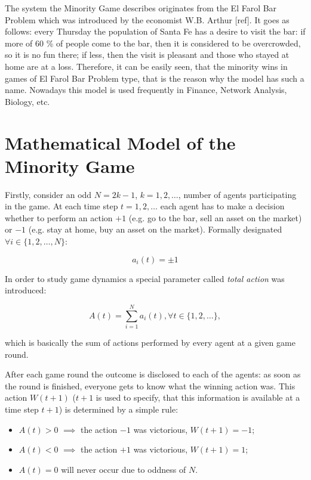 \documentclass[12pt,american,czech]{article}
\begin{document}
\medskip
 
The system the Minority Game describes originates from the El Farol Bar Problem which was introduced by the economist W.B. Arthur [ref]. It goes as follows: every Thursday the population of Santa Fe has a desire to visit the bar: if more of 60 \% of people come to the bar, then it is considered to be overcrowded, so it is no fun there; if less, then the visit is pleasant and those who stayed at home are at a loss. Therefore, it can be easily seen, that the minority wins in games of El Farol Bar Problem type, that is the reason why the model has such a name. Nowadays this model is used frequently in Finance, Network Analysis, Biology, etc.

\section{Mathematical Model of the Minority Game}

Firstly, consider an odd $N=2k-1$, $k=1,2,\dots$, number of agents participating in the game. At each time step $t=1,2,\dots$ each agent has to make a decision whether to perform an action $+1$ (e.g. go to the bar, sell an asset on the market) or $-1$ (e.g. stay at home, buy an asset on the market). Formally designated $\forall i\in\{1,2,\dots,N\}$:

\begin{equation}
a_{i}(t)=\pm 1
\end{equation}

In order to study game dynamics a special parameter called \textit{total action} was introduced: 

\begin{equation}
A(t)=\sum_{i=1}^{N}a_{i}(t), \forall t\in\{1,2,\dots\},
\end{equation}

\noindent
which is basically the sum of actions performed by every agent at a given game round.

\medskip

After each game round the outcome is disclosed to each of the agents: as soon as the round is finished, everyone gets to know what the winning action was. This action $W(t+1)$ ($t+1$ is used to specify, that this information is available at a time step $t+1$) is determined by a simple rule:

\begin{itemize}
\item $A(t)>0$ $\implies$ the action $-1$ was victorious, $W(t+1)=-1$;
\item $A(t)<0$ $\implies$ the action $+1$ was victorious, $W(t+1)=1$;
\item $A(t)=0$ will never occur due to oddness of $N$.
\end{itemize} 
\end{document}
